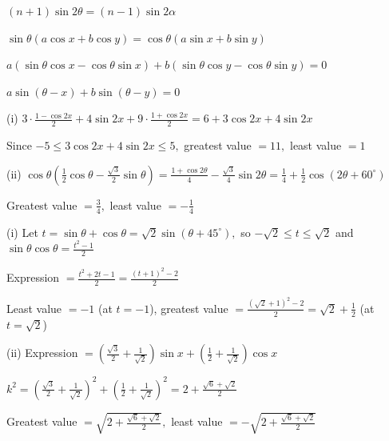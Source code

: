   $(n + 1)\sin 2\theta = (n - 1)\sin 2\alpha$

\item $\sin\theta(a\cos x + b\cos y) = \cos\theta(a\sin x + b\sin y)$

  $a(\sin\theta\cos x - \cos\theta\sin x) + b(\sin\theta\cos y - \cos\theta\sin y) = 0$

  $a\sin(\theta - x) + b\sin(\theta - y) = 0$

\item (i) $3\cdot\frac{1 - \cos 2x}{2} + 4\sin 2x + 9\cdot\frac{1 + \cos 2x}{2} = 6 + 3\cos 2x + 4\sin 2x$

  Since $-5 \leq 3\cos 2x + 4\sin 2x \leq 5,$ greatest value $= 11,$ least value $= 1$

  (ii) $\cos\theta\left(\frac{1}{2}\cos\theta - \frac{\sqrt{3}}{2}\sin\theta\right) = \frac{1 + \cos 2\theta}{4} -
  \frac{\sqrt{3}}{4}\sin 2\theta = \frac{1}{4} + \frac{1}{2}\cos(2\theta + 60^\circ)$

  Greatest value $= \frac{3}{4},$ least value $= -\frac{1}{4}$

\item (i) Let $t = \sin\theta + \cos\theta = \sqrt{2}\sin(\theta + 45^\circ),$ so $-\sqrt{2} \leq t \leq \sqrt{2}$ and
  $\sin\theta\cos\theta = \frac{t^2 - 1}{2}$

  Expression $= \frac{t^2 + 2t - 1}{2} = \frac{(t + 1)^2 - 2}{2}$

  Least value $= -1$ (at $t = -1$), greatest value $= \frac{(\sqrt{2} + 1)^2 - 2}{2} = \sqrt{2} + \frac{1}{2}$ (at $t =
  \sqrt{2}$)

  (ii) Expression $= \left(\frac{\sqrt{3}}{2} + \frac{1}{\sqrt{2}}\right)\sin x + \left(\frac{1}{2} +
  \frac{1}{\sqrt{2}}\right)\cos x$

  $k^2 = \left(\frac{\sqrt{3}}{2} + \frac{1}{\sqrt{2}}\right)^2 + \left(\frac{1}{2} + \frac{1}{\sqrt{2}}\right)^2 = 2 +
  \frac{\sqrt{6} + \sqrt{2}}{2}$

  Greatest value $= \sqrt{2 + \frac{\sqrt{6} + \sqrt{2}}{2}},$ least value $= -\sqrt{2 + \frac{\sqrt{6} +
  \sqrt{2}}{2}}$
\stopitemize
